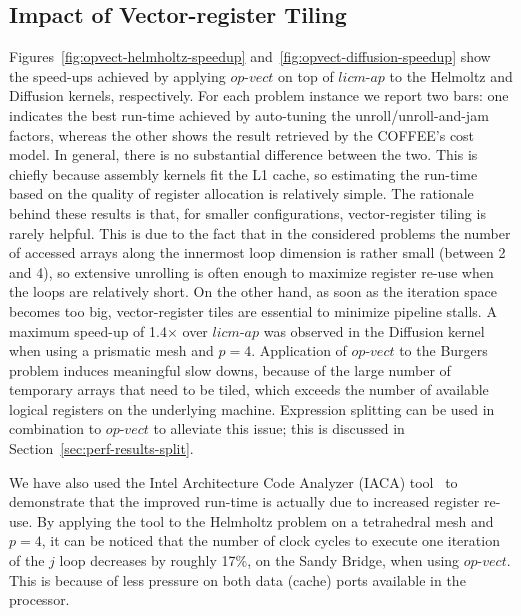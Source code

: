 \documentclass[conference]{IEEEtran}
\begin{document}
\subsection{Impact of Vector-register Tiling}
\label{sec:perf-eval-opvect}
Figures~\ref{fig:opvect-helmholtz-speedup} and~\ref{fig:opvect-diffusion-speedup} show the speed-ups achieved by applying $op$-$vect$ on top of $licm$-$ap$ to the Helmoltz and Diffusion kernels, respectively. For each problem instance we report two bars: one indicates the best run-time achieved by auto-tuning the unroll/unroll-and-jam factors, whereas the other shows the result retrieved by the COFFEE's cost model. In general, there is no substantial difference between the two. This is chiefly because assembly kernels fit the L1 cache, so estimating the run-time based on the quality of register allocation is relatively simple. The rationale behind these results is that, for smaller configurations, vector-register tiling is rarely helpful. This is due to the fact that in the considered problems the number of accessed arrays along the innermost loop dimension is rather small (between 2 and 4), so extensive unrolling is often enough to maximize register re-use when the loops are relatively short. On the other hand, as soon as the iteration space becomes too big, vector-register tiles are essential to minimize pipeline stalls. A maximum speed-up of 1.4$\times$ over $licm$-$ap$ was observed in the Diffusion kernel when using a prismatic mesh and $p=4$. Application of $op$-$vect$ to the Burgers problem induces meaningful slow downs, because of the large number of temporary arrays that need to be tiled, which exceeds the number of available logical registers on the underlying machine. Expression splitting can be used in combination to $op$-$vect$ to alleviate this issue; this is discussed in Section~\ref{sec:perf-results-split}.

We have also used the Intel Architecture Code Analyzer (IACA) tool~\cite{IACA} to demonstrate that the improved run-time is actually due to increased register re-use. By applying the tool to the Helmholtz problem on a tetrahedral mesh and $p=4$, it can be noticed that the number of clock cycles to execute one iteration of the $j$ loop decreases by roughly 17$\%$, on the Sandy Bridge, when using $op$-$vect$. This is because of less pressure on both data (cache) ports available in the processor.
\end{document}
